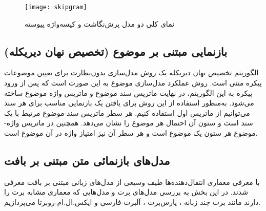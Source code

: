 \begin{figure}[h!]
	\texttt{[image: skipgram]}
	\centering
	\caption{نمای کلی دو مدل پرش‌نگاشت و کیسه‌واژه پیوسته \citep{suleiman2017deep}}
	\label{fig.skipgram}
\end{figure}


\subsection{بازنمایی مبتنی ‌بر موضوع (تخصیص نهان دیریکله)}
\label{sec:lda}
الگوریتم تخصیص نهان دیریکله یک روش مدل‌سازی بدون‌نظارت برای تعیین موضوعات پیکره متنی است. روش عملکرد مدل‌سازی موضوع به این صورت است که پس از ورود پیکره به این الگوریتم، در نهایت ماتریس سند-موضوع و ماتریس واژه-موضوع ساخته می‌شود. به‌منظور استفاده از این روش برای یافتن یک بازنمایی مناسب برای هر سند می‌توانیم از ماتریس اول استفاده کنیم. هر سطر ماتریس سند-موضوع مرتبط با یک سند است و ستون آن احتمال هر موضوع را نشان می‌دهد. همچنین در ماتریس واژه-موضوع هر ستون یک موضوع است و هر سطر آن نیز امتیاز واژه در آن موضوع است.

\subsection{مدل‌های بازنمائی متن مبتنی بر بافت}
\label{section.pretrained_models}
با معرفی معماری انتفال‌دهنده‌ها  \citep{vaswani2017} طیف وسیعی از مدل‌های زبانی مبتنی بر بافت معرفی شدند. در این بخش به بررسی مدل‌های برت \citep{devlin2018bert} و مدل‌هایی که معماری مشابه برت را دارند مانند برت چند زبانه ،
پارس‌برت  \citep{ParsBERT}،
آلبرت‌-فارسی  \citep{ALBERTPersian} و ایکس.ال.ام-روبرتا  \citep{conneau2019unsupervised} می‌پردازیم.


